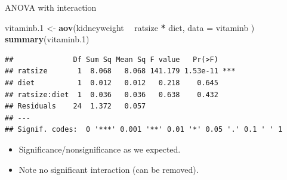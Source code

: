\documentclass[ignorenonframetext,]{beamer}
\newenvironment{Shaded}{\begin{snugshade}}{\end{snugshade}}
\newcommand{\DataTypeTok}[1]{\textcolor[rgb]{0.13,0.29,0.53}{#1}}
\newcommand{\FloatTok}[1]{\textcolor[rgb]{0.00,0.00,0.81}{#1}}
\newcommand{\KeywordTok}[1]{\textcolor[rgb]{0.13,0.29,0.53}{\textbf{#1}}}
\newcommand{\NormalTok}[1]{#1}
\newcommand{\OperatorTok}[1]{\textcolor[rgb]{0.81,0.36,0.00}{\textbf{#1}}}
\newcommand{\StringTok}[1]{\textcolor[rgb]{0.31,0.60,0.02}{#1}}
\providecommand{\tightlist}{%
  \setlength{\itemsep}{0pt}\setlength{\parskip}{0pt}}
\begin{document}
\begin{frame}[fragile]{ANOVA with interaction}
\protect\hypertarget{anova-with-interaction}{}

\begin{Shaded}
\begin{Highlighting}[]
\NormalTok{vitaminb}\FloatTok{.1}\NormalTok{ <-}\StringTok{ }\KeywordTok{aov}\NormalTok{(kidneyweight }\OperatorTok{~}\StringTok{ }\NormalTok{ratsize }\OperatorTok{*}\StringTok{ }\NormalTok{diet,}
  \DataTypeTok{data =}\NormalTok{ vitaminb}
\NormalTok{)}
\KeywordTok{summary}\NormalTok{(vitaminb}\FloatTok{.1}\NormalTok{)}
\end{Highlighting}
\end{Shaded}

\begin{verbatim}
##              Df Sum Sq Mean Sq F value   Pr(>F)    
## ratsize       1  8.068   8.068 141.179 1.53e-11 ***
## diet          1  0.012   0.012   0.218    0.645    
## ratsize:diet  1  0.036   0.036   0.638    0.432    
## Residuals    24  1.372   0.057                     
## ---
## Signif. codes:  0 '***' 0.001 '**' 0.01 '*' 0.05 '.' 0.1 ' ' 1
\end{verbatim}

\begin{itemize}
\tightlist
\item
  Significance/nonsignificance as we expected.
\item
  Note no significant interaction (can be removed).
\end{itemize}

\end{frame}
\end{document}
